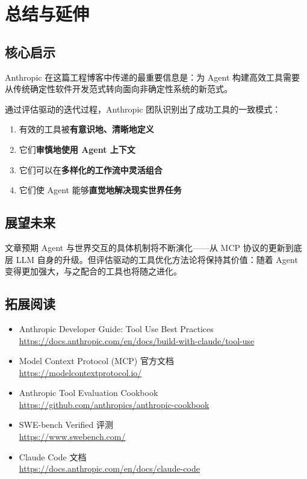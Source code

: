\section{总结与延伸}

\subsection{核心启示}

Anthropic 在这篇工程博客中传递的最重要信息是：为 Agent 构建高效工具需要从传统确定性软件开发范式转向面向非确定性系统的新范式。

通过评估驱动的迭代过程，Anthropic 团队识别出了成功工具的一致模式：

\begin{enumerate}[leftmargin=1.5em]
    \item 有效的工具被\textbf{有意识地、清晰地定义}
    \item 它们\textbf{审慎地使用 Agent 上下文}
    \item 它们可以在\textbf{多样化的工作流中灵活组合}
    \item 它们使 Agent 能够\textbf{直觉地解决现实世界任务}
\end{enumerate}

\subsection{展望未来}

文章预期 Agent 与世界交互的具体机制将不断演化——从 MCP 协议的更新到底层 LLM 自身的升级。但评估驱动的工具优化方法论将保持其价值：随着 Agent 变得更加强大，与之配合的工具也将随之进化。

\subsection{拓展阅读}

\begin{itemize}[leftmargin=1.5em]
    \item Anthropic Developer Guide: Tool Use Best Practices\\ \url{https://docs.anthropic.com/en/docs/build-with-claude/tool-use}
    \item Model Context Protocol (MCP) 官方文档\\ \url{https://modelcontextprotocol.io/}
    \item Anthropic Tool Evaluation Cookbook\\ \url{https://github.com/anthropics/anthropic-cookbook}
    \item SWE-bench Verified 评测\\ \url{https://www.swebench.com/}
    \item Claude Code 文档\\ \url{https://docs.anthropic.com/en/docs/claude-code}
\end{itemize}



